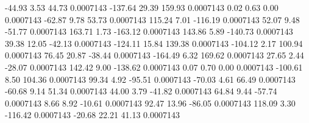       -44.93        3.53       44.73     0.0007143
     -137.64       29.39      159.93     0.0007143
        0.02        0.63        0.00     0.0007143
      -62.87        9.78       53.73     0.0007143
      115.24        7.01     -116.19     0.0007143
       52.07        9.48      -51.77     0.0007143
      163.71        1.73     -163.12     0.0007143
      143.86        5.89     -140.73     0.0007143
       39.38       12.05      -42.13     0.0007143
     -124.11       15.84      139.38     0.0007143
     -104.12        2.17      100.94     0.0007143
       76.45       20.87      -38.44     0.0007143
     -164.49        6.32      169.62     0.0007143
       27.65        2.44      -28.07     0.0007143
      142.42        9.00     -138.62     0.0007143
        0.07        0.70        0.00     0.0007143
     -100.61        8.50      104.36     0.0007143
       99.34        4.92      -95.51     0.0007143
      -70.03        4.61       66.49     0.0007143
      -60.68        9.14       51.34     0.0007143
       44.00        3.79      -41.82     0.0007143
       64.84        9.44      -57.74     0.0007143
        8.66        8.92      -10.61     0.0007143
       92.47       13.96      -86.05     0.0007143
      118.09        3.30     -116.42     0.0007143
      -20.68       22.21       41.13     0.0007143
